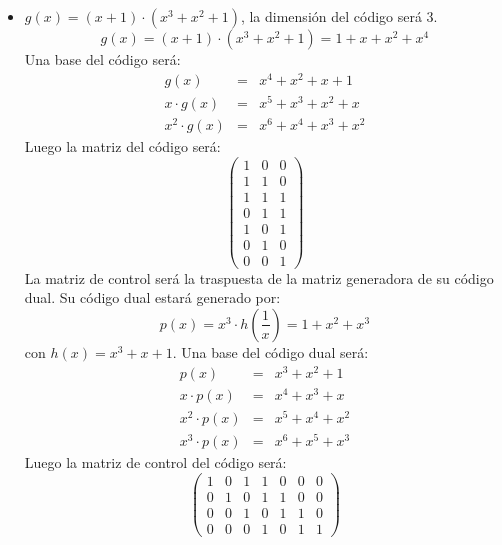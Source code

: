 \begin{itemize}
\item $g(x)=(x+1)\cdot (x^3+x^2+1)$, la dimensi\'on del c\'odigo ser\'a $3$.
\begin{displaymath}
g(x)=(x+1)\cdot (x^3+x^2+1)= 1+x+x^2+x^4
\end{displaymath}
Una base del c\'odigo ser\'a:
\begin{eqnarray*}
g(x)&=&x^4+x^2+x+1\\
x\cdot g(x)&=&x^5+x^3+x^2+x\\
x^2\cdot g(x)&=&x^6+x^4+x^3+x^2
\end{eqnarray*}
Luego la matriz del c\'odigo ser\'a:
\begin{displaymath}
\left( \begin{array}{ccc}
1&0&0\\
1&1&0\\
1&1&1\\
0&1&1\\
1&0&1\\
0&1&0\\
0&0&1
\end{array} \right)
\end{displaymath}
La matriz de control ser\'a la traspuesta de la matriz generadora de su
c\'odigo dual. Su c\'odigo dual estar\'a generado por:
\begin{displaymath}
p(x) = x^3\cdot h(\frac{1}{x}) = 1+x^2+x^3
\end{displaymath}
con $h(x)=x^3+x+1$. Una base del c\'odigo dual ser\'a:
\begin{eqnarray*}
p(x)&=& x^3+x^2+1\\
x\cdot p(x)&=& x^4+x^3+x\\
x^2\cdot p(x)&=& x^5+x^4+x^2\\
x^3\cdot p(x)&=& x^6+x^5+x^3
\end{eqnarray*}
Luego la matriz de control del c\'odigo ser\'a:
\begin{displaymath}
\left( \begin{array}{ccccccc}
1&0&1&1&0&0&0\\
0&1&0&1&1&0&0\\
0&0&1&0&1&1&0\\
0&0&0&1&0&1&1
\end{array} \right)
\end{displaymath}


\end{itemize}
